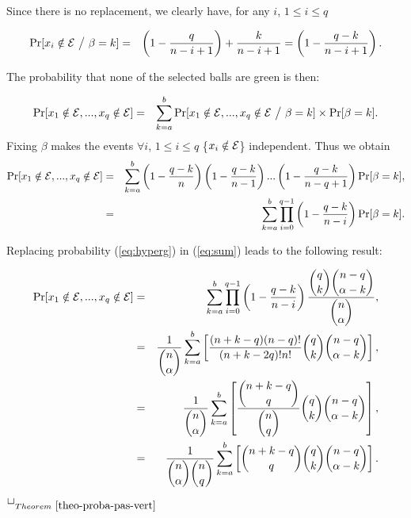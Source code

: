 \documentclass[]{llncs}
\newcommand{\toto}{xxx}
\newenvironment{proofT}{\noindent{\bf
Proof }} {\hspace*{\fill}$\Box_{Theorem~\ref{\toto}}$\par\vspace{3mm}}
\begin{document}
\begin{proofT}
{Since there is no replacement, we clearly have, for any $i$, $1\leq i \leq q$ 

\begin{eqnarray}
  \Pr[x_i\notin {\cal E} ~\big/ ~ \beta = k] &=&
   \left(1-\frac{q}{n-i+1}\right) + \frac{k}{n-i+1} = \left(1-\frac{q-k}{n-i+1}\right). \notag
\end{eqnarray}

The probability that none of the selected balls are green is then:

\begin{eqnarray}
	  \Pr[x_1 \notin {\cal E}, ..., x_q \notin {\cal E}] &=& 
	  \sum^{b}_{k=a} \Pr[x_1 \notin {\cal E}, ..., x_q \notin {\cal E}  ~\big/ ~ \beta=k] \times \Pr[\beta=k]. \notag
\end{eqnarray}
Fixing $\beta$ makes the events $\forall i$, $1\leq i \leq q$ \{$x_i \notin {\cal E}$\} independent.  Thus we obtain
\begin{eqnarray}
	  \Pr[x_1 \notin {\cal E}, ..., x_q \notin {\cal E}] &=& \sum^{b}_{k=a}\left(1-\frac{q-k}{n}\right)\left(1-\frac{q-k}{n-1}\right)...\left(1-\frac{q-k}{n-q+1}\right)\Pr[\beta=k], \notag \\ 
	  &=& \sum^{b}_{k=a}\prod^{q-1}_{i=0}\left(1-\frac{q-k}{n-i}\right)\Pr[\beta=k]. \label{eq:sum}
\end{eqnarray}

Replacing probability (\ref{eq:hyperg}) in (\ref{eq:sum}) leads to the following result:
	
	\begin{eqnarray}
	  \Pr[x_1 \notin {\cal E}, ..., x_q \notin {\cal E}] &=& \sum^{b}_{k=a}\prod^{q-1}_{i=0}\left(1-\frac{q-k}{n-i}\right) \frac{\displaystyle{{q \choose k}{n-q \choose \alpha-k}}}{\displaystyle{n \choose \alpha}},\notag \\
	  &=& \frac{1}{\displaystyle{n \choose \alpha}}\sum^{b}_{k=a}\left[\frac{(n+k-q)(n-q)!}{(n+k-2q)!n!} \displaystyle{q \choose k}{n-q \choose \alpha-k}\right], \notag \\
	  &=& \frac{1}{\displaystyle{n \choose \alpha}}\sum^{b}_{k=a}\left[\frac{\displaystyle{n+k-q \choose q}}{\displaystyle{n \choose q}} {q \choose k}{n-q \choose \alpha-k}\right], \notag \\
	  &=& \frac{1}{\displaystyle{n \choose \alpha}\displaystyle{n \choose q}}\sum^{b}_{k=a}\left[\displaystyle{n+k-q \choose q}{q \choose k}{n-q \choose \alpha-k}\right]. \notag
\end{eqnarray}
	
	} \renewcommand{\toto}{theo-proba-pas-vert}\end{proofT}
\end{document}
